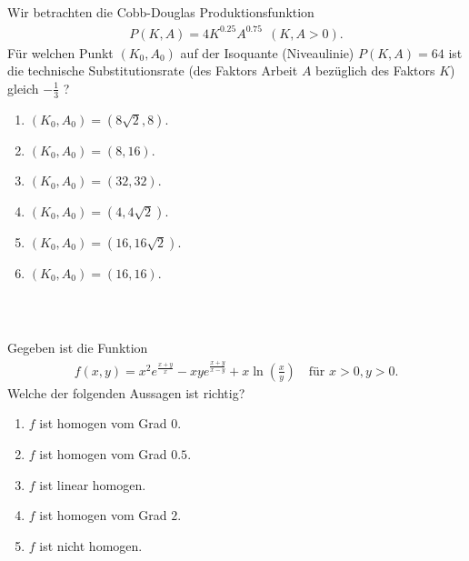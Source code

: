 \subsection*{}
Wir betrachten die Cobb-Douglas Produktionsfunktion
\begin{align*}
	P(K,A) 
	=
	4 K^{0.25} A^{0.75} \ \ (K,A > 0).
\end{align*}
Für welchen Punkt $ (K_0, A_0) $ auf der Isoquante (Niveaulinie) $ P(K,A) = 64 $ ist die technische Substitutionsrate (des Faktors Arbeit $ A $ bezüglich des Faktors $ K $) gleich $ - \frac{1}{3} $ ?
\renewcommand{\labelenumi}{(\alph{enumi})}
\begin{enumerate}
	\item 
	$ (K_0, A_0) = ( 8 \sqrt{2}, 8 ) $.
	\item
	$ (K_0, A_0) = ( 8 , 16 )$.
	\item
	$ (K_0, A_0) = ( 32 , 32)$.
	\item
	$ (K_0, A_0) = ( 4 , 4\sqrt{2})$.
	\item
	$ (K_0, A_0) = ( 16 , 16\sqrt{2})$.
	\item
	$ (K_0, A_0) = ( 16 , 16)$.
\end{enumerate}
\ \\
\subsection*{}
Gegeben ist die Funktion
\begin{align*}
	f(x,y) 
	=
	x^2 e^{\frac{x+y}{x}}
	-
	xy e^{\frac{x+y}{x-y}}
	+
	x \ln \left( \frac{x}{y} \right)
	\quad \textrm{für } x>0,y>0.
\end{align*}
Welche der folgenden Aussagen ist richtig?
\renewcommand{\labelenumi}{(\alph{enumi})}
\begin{enumerate}
	\item
	$ f  $ ist homogen vom Grad $ 0 $.
	\item
	$ f  $ ist homogen vom Grad $ 0.5 $.
	\item
	$ f $ ist linear homogen.	
	\item 
	$ f  $ ist homogen vom Grad $ 2 $.
	\item
	$ f $ ist nicht homogen.
\end{enumerate}
\ \\
